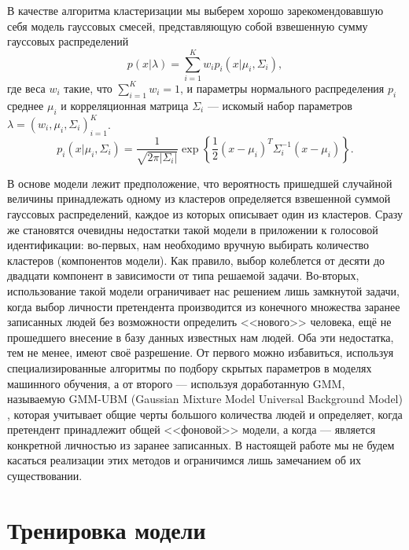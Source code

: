 \documentclass[12pt]{gost-7-32}
\begin{document}
В качестве алгоритма кластеризации мы выберем хорошо зарекомендовавшую себя \cite{hindi_gmm} модель гауссовых смесей, представляющую собой взвешенную сумму гауссовых распределений
\begin{equation}
    p(x | \lambda) = \sum_{i = 1}^K w_i p_i(x | \mu_i, \Sigma_i),
\end{equation}
где веса $w_i$ такие, что $\sum_{i = 1}^K w_i = 1$, и параметры нормального распределения $p_i$ среднее $\mu_i$ и корреляционная матрица $\Sigma_i$ --- искомый набор параметров $\lambda = (w_i, \mu_i, \Sigma_i)_{i = 1}^K$.
\begin{equation}
    p_i(x | \mu_i, \Sigma_i) = \frac{1}{\sqrt{2 \pi |\Sigma_i|}} \exp \left\{ \frac{1}{2} (x - \mu_i)^T \Sigma_i^{-1} (x - \mu_i) \right\}.
\end{equation}

В основе модели лежит предположение, что вероятность пришедшей случайной величины принадлежать одному из кластеров определяется взвешенной суммой гауссовых распределений, каждое из которых описывает один из кластеров.
Сразу же становятся очевидны недостатки такой модели в приложении к голосовой идентификации: во-первых, нам необходимо вручную выбирать количество кластеров (компонентов модели).
Как правило, выбор колеблется от десяти до двадцати компонент в зависимости от типа решаемой задачи.
Во-вторых, использование такой модели ограничивает нас решением лишь замкнутой задачи, когда выбор личности претендента производится из конечного множества заранее записанных людей без возможности определить <<нового>> человека, ещё не прошедшего внесение в базу данных известных нам людей.
Оба эти недостатка, тем не менее, имеют своё разрешение.
От первого можно избавиться, используя специализированные алгоритмы по подбору скрытых параметров в моделях машинного обучения, а от второго --- используя доработанную GMM, называемую GMM-UBM (Gaussian Mixture Model Universal Background Model) \cite{gmm_ubm_smartphone, gmm_ubm_hindi, forensic_gmm_ubm_mfcc}, которая учитывает общие черты большого количества людей и определяет, когда претендент принадлежит общей <<фоновой>> модели, а когда --- является конкретной личностью из заранее записанных.
В настоящей работе мы не будем касаться реализации этих методов и ограничимся лишь замечанием об их существовании.

\section{Тренировка модели}
\end{document}
